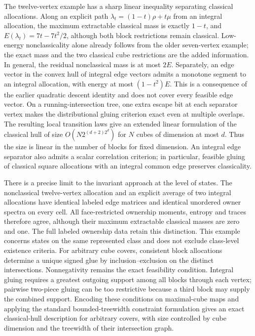 \documentclass[11pt]{article}
\theoremstyle{definition}
\begin{document}
The twelve-vertex example has a sharp linear inequality separating classical
allocations. Along an explicit path $\lambda_t=(1-t)\rho+t\mu$ from an
integral allocation, the maximum extractable classical mass is exactly
$1-t$, and $E(\lambda_t)=7t-7t^2/2$, although both block restrictions remain
classical. Low-energy nonclassicality alone already follows from the older
seven-vertex example; the exact mass and the two classical cube restrictions
are the added information. In general, the residual nonclassical mass is at
most $2E$. Separately, an edge vector in the convex hull of integral edge
vectors admits a monotone segment to an integral allocation, with energy
at most $(1-t^2)E$. This is a consequence of the earlier quadratic descent
identity and does not cover every feasible edge vector.
On a running-intersection tree, one extra escape bit at each separator
vertex makes the distributional gluing criterion exact even at multiple
overlaps. The resulting local transition laws give an extended linear
formulation of the classical hull of size $O(N2^{(d+2)2^d})$ for $N$ cubes
of dimension at most $d$. Thus the size is linear in the number of blocks
for fixed dimension. An integral edge separator also admits a scalar
correlation criterion; in particular, feasible gluing of classical square
allocations with an integral common edge preserves classicality.

There is a precise limit to the invariant approach at the level of states.
The nonclassical twelve-vertex allocation and an explicit average of two
integral allocations have identical labeled edge matrices and identical
unordered owner spectra on every cell. All face-restricted ownership
moments, entropy and traces therefore agree, although their maximum
extractable classical masses are zero and one. The full labeled ownership
data retain this distinction. This example concerns states on the same
represented class and does not exclude class-level existence criteria.
For arbitrary cube covers, consistent block allocations determine a unique
signed glue by inclusion--exclusion on the distinct intersections.
Nonnegativity remains the exact feasibility condition. Integral gluing
requires a greatest outgoing support among all blocks through each vertex;
pairwise two-piece gluing can be too restrictive because a third block may
supply the combined support. Encoding these conditions on maximal-cube maps
and applying the standard bounded-treewidth constraint formulation gives an
exact classical-hull description for arbitrary covers, with size controlled
by cube dimension and the treewidth of their intersection graph.
\end{document}
